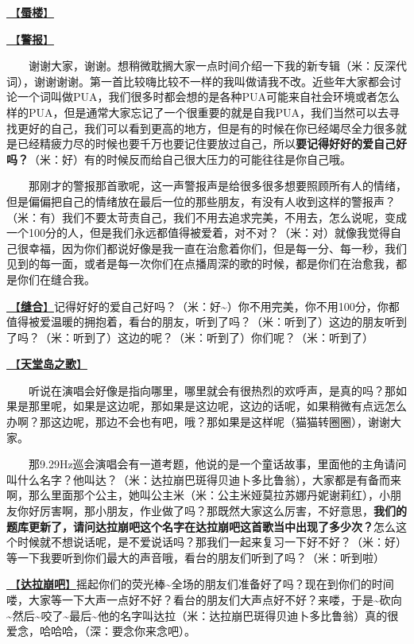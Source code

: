 \documentclass[]{ctexbook}
\begin{document}
\hyperref[mirage]{🎵【\textbf{蜃楼}】}

\hyperref[the-giver]{🎵【\textbf{警报}】}

  谢谢大家，谢谢。想稍微耽搁大家一点时间介绍一下我的新专辑（米：反深代词），谢谢谢谢。第一首比较嗨比较不一样的我叫做请我不改。近些年大家都会讨论一个词叫做PUA，我们很多时都会想的是各种PUA可能来自社会环境或者怎么样的PUA，但是通常大家忘记了一个很重要的就是自我PUA，我们当然可以去寻找更好的自己，我们可以看到更高的地方，但是有的时候在你已经竭尽全力很多就是已经精疲力尽的时候也要千万也要记住要放过自己，所以\textbf{要记得好好的爱自己好吗？}（米：好）有的时候反而给自己很大压力的可能往往是你自己哦。

  那刚才的警报那首歌呢，这一声警报声是给很多很多想要照顾所有人的情绪，但是偏偏把自己的情绪放在最后一位的那些朋友，有没有人收到这样的警报声？（米：有）我们不要太苛责自己，我们不用去追求完美，不用去，怎么说呢，变成一个100分的人，但是我们永远都值得被爱着，对不对？（米：对）就像我觉得自己很幸福，因为你们都说好像是我一直在治愈着你们，但是每一分、每一秒，我们见到的每一面，或者是每一次你们在点播周深的歌的时候，都是你们在治愈我，都是你们在缝合我。

\hyperref[fix-you]{🎵【\textbf{缝合}】}记得好好的爱自己好吗？（米：好\textasciitilde）你不用完美，你不用100分，你都值得被爱温暖的拥抱着，看台的朋友，听到了吗？（米：听到了）这边的朋友听到了吗？（米：听到了）这边的呢？（米：听到了）你们呢？（米：听到了）

\hyperref[haven-song]{🎵【\textbf{天堂岛之歌}】}

  听说在演唱会好像是指向哪里，哪里就会有很热烈的欢呼声，是真的吗？那如果是那里呢，如果是这边呢，那如果是这边呢，这边的话呢，如果稍微有点远怎么办啊？那这边呢，那边不会也有吧，哦？那如果是这样呢（猫猫转圈圈），谢谢大家。

  那9.29Hz巡会演唱会有一道考题，他说的是一个童话故事，里面他的主角请问叫什么名字？他叫达？（米：达拉崩巴斑得贝迪卜多比鲁翁），大家都是有备而来啊，那么里面那个公主，她叫公主米（米：公主米娅莫拉苏娜丹妮谢莉红），小朋友你好厉害啊，那小朋友，作业做了吗？那既然大家这么厉害，不好意思，\textbf{我们的题库更新了，请问达拉崩吧这个名字在达拉崩吧这首歌当中出现了多少次？}怎么这个时候就不想说话呢，是不爱说话吗？那我们一起来复习一下好不好？（米：好）等一下我要听到你们最大的声音哦，看台的朋友们听到了吗？（米：听到啦）

\hyperref[dalabengba]{🎵【\textbf{达拉崩吧}】}摇起你们的荧光棒\textasciitilde 全场的朋友们准备好了吗？现在到你们的时间喽，大家等一下大声一点好不好？看台的朋友们大声点好不好？来喽，于是\textasciitilde 砍向\textasciitilde 然后\textasciitilde 咬了\textasciitilde 最后\textasciitilde 他的名字叫达拉（米：达拉崩巴斑得贝迪卜多比鲁翁）真的很爱念，哈哈哈，（深：要念你来念吧）。
\end{document}
